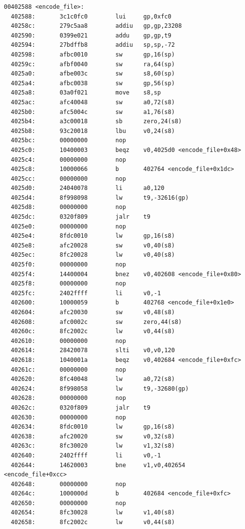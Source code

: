\documentclass[11pt]{article}
\begin{document}
\begin{verbatim}
00402588 <encode_file>:
  402588:       3c1c0fc0        lui     gp,0xfc0
  40258c:       279c5aa8        addiu   gp,gp,23208
  402590:       0399e021        addu    gp,gp,t9
  402594:       27bdffb8        addiu   sp,sp,-72
  402598:       afbc0010        sw      gp,16(sp)
  40259c:       afbf0040        sw      ra,64(sp)
  4025a0:       afbe003c        sw      s8,60(sp)
  4025a4:       afbc0038        sw      gp,56(sp)
  4025a8:       03a0f021        move    s8,sp
  4025ac:       afc40048        sw      a0,72(s8)
  4025b0:       afc5004c        sw      a1,76(s8)
  4025b4:       a3c00018        sb      zero,24(s8)
  4025b8:       93c20018        lbu     v0,24(s8)
  4025bc:       00000000        nop
  4025c0:       10400003        beqz    v0,4025d0 <encode_file+0x48>
  4025c4:       00000000        nop
  4025c8:       10000066        b       402764 <encode_file+0x1dc>
  4025cc:       00000000        nop
  4025d0:       24040078        li      a0,120
  4025d4:       8f998098        lw      t9,-32616(gp)
  4025d8:       00000000        nop
  4025dc:       0320f809        jalr    t9
  4025e0:       00000000        nop
  4025e4:       8fdc0010        lw      gp,16(s8)
  4025e8:       afc20028        sw      v0,40(s8)
  4025ec:       8fc20028        lw      v0,40(s8)
  4025f0:       00000000        nop
  4025f4:       14400004        bnez    v0,402608 <encode_file+0x80>
  4025f8:       00000000        nop
  4025fc:       2402ffff        li      v0,-1
  402600:       10000059        b       402768 <encode_file+0x1e0>
  402604:       afc20030        sw      v0,48(s8)
  402608:       afc0002c        sw      zero,44(s8)
  40260c:       8fc2002c        lw      v0,44(s8)
  402610:       00000000        nop
  402614:       28420078        slti    v0,v0,120
  402618:       1040001a        beqz    v0,402684 <encode_file+0xfc>
  40261c:       00000000        nop
  402620:       8fc40048        lw      a0,72(s8)
  402624:       8f998058        lw      t9,-32680(gp)
  402628:       00000000        nop
  40262c:       0320f809        jalr    t9
  402630:       00000000        nop
  402634:       8fdc0010        lw      gp,16(s8)
  402638:       afc20020        sw      v0,32(s8)
  40263c:       8fc30020        lw      v1,32(s8)
  402640:       2402ffff        li      v0,-1
  402644:       14620003        bne     v1,v0,402654 <encode_file+0xcc>
  402648:       00000000        nop
  40264c:       1000000d        b       402684 <encode_file+0xfc>
  402650:       00000000        nop
  402654:       8fc30028        lw      v1,40(s8)
  402658:       8fc2002c        lw      v0,44(s8)

\end{verbatim}
\end{document}
